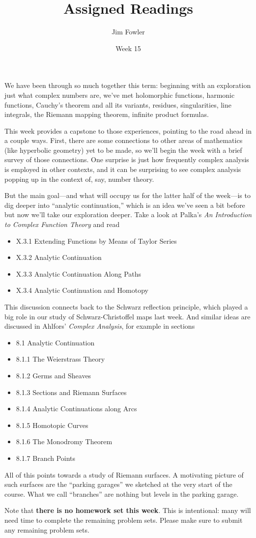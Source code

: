 \documentclass{homework}
\author{Jim Fowler}
\title{Assigned Readings}
\date{Week 15}
\begin{document}
\maketitle

We have been through so much together this term: beginning with an
exploration just what complex numbers are, we've met holomorphic
functions, harmonic functions, Cauchy's theorem and all its variants,
residues, singularities, line integrals, the Riemann mapping theorem,
infinite product formulas.

This week provides a capstone to those experiences, pointing to the
road ahead in a couple ways.  First, there are some connections to
other areas of mathematics (like hyperbolic geometry) yet to be made,
so we'll begin the week with a brief survey of those connections.  One
surprise is just how frequently complex analysis is employed in other
contexts, and it can be surprising to see complex analysis popping up
in the context of, say, number theory.

But the main goal---and what will occupy us for the latter half of the
week---is to dig deeper into ``analytic continuation,'' which is an
idea we've seen a bit before but now we'll take our exploration
deeper.  Take a look at Palka's \textit{An Introduction to Complex
  Function Theory} and read
\begin{itemize}
\item X.3.1 Extending Functions by Means of Taylor Series 
\item X.3.2 Analytic Continuation
\item X.3.3 Analytic Continuation Along Paths
\item X.3.4 Analytic Continuation and Homotopy
\end{itemize}
This discussion connects back to the Schwarz reflection principle,
which played a big role in our study of Schwarz-Christoffel maps last
week.  And similar ideas are discussed in Ahlfors' \textit{Complex
  Analysis}, for example in sections
\begin{itemize}
\item 8.1 Analytic Continuation
\item 8.1.1 The Weierstrass Theory
\item 8.1.2 Germs and Sheaves
\item 8.1.3 Sections and Riemann Surfaces
\item 8.1.4 Analytic Continuations along Arcs
\item 8.1.5 Homotopic Curves
\item 8.1.6 The Monodromy Theorem
\item 8.1.7 Branch Points
\end{itemize}
All of this points towards a study of Riemann surfaces.  A motivating
picture of such surfaces are the ``parking garages'' we sketched at
the very start of the course.  What we call ``branches'' are nothing
but levels in the parking garage.

Note that \textbf{there is no homework set this week}.  This is
intentional: many will need time to complete the remaining problem
sets.  Please make sure to submit any remaining problem sets.
\end{document}
